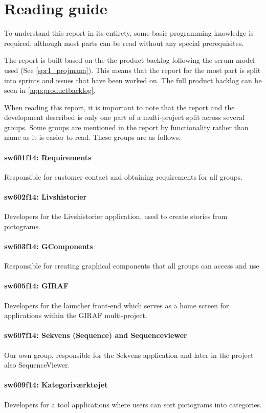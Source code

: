 \section*{Reading guide}

To understand this report in its entirety, some basic programming knowledge is required, although most parts can be read without any special prerequisites.

The report is built based on the the product backlog following the scrum model used (See \ref{spr1_projmana}). This means that the report for the most part is split into sprints and issues that have been worked on. The full product backlog can be seen in \ref{app:productbacklog}.

When reading this report, it is important to note that the report and the development described is only one part of a multi-project split across several groups. Some groups are mentioned in the report by functionality rather than name as it is easier to read. These groups are as follows:

\paragraph{sw601f14: Requirements}
Responsible for customer contact and obtaining requirements for all groups.
\paragraph{sw602f14: Livshistorier}
Developers for the Livshistorier application, used to create stories from pictograms.
\paragraph{sw603f14: GComponents}
Responsible for creating graphical components that all groups can access and use
\paragraph{sw605f14: GIRAF}
Developers for the launcher front-end which serves as a home screen for applications within the GIRAF multi-project.
\paragraph{sw607f14: Sekvens (Sequence) and Sequenceviewer}
Our own group, responsible for the Sekvens application and later in the project also SequenceViewer.
\paragraph{sw609f14: Kategoriværktøjet}
Developers for a tool applications where users can sort pictograms into categories.
